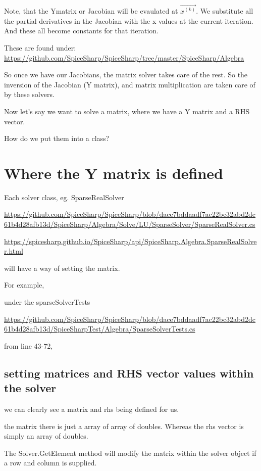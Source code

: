 \documentclass[12pt]{article}
\renewcommand{\_}{\kern-1.5pt\textunderscore\kern-1.5pt}
\begin{document}
Note, that the Ymatrix or Jacobian will be evaulated at \textbf{$\overrightarrow{x^{(k)}}$}. We substitute all the partial derivatives in the Jacobian with the x values at the current iteration. And these all become constants for that iteration.


These are found under:
\url{https://github.com/SpiceSharp/SpiceSharp/tree/master/SpiceSharp/Algebra}

So once we have our Jacobians, the matrix solver takes care of the rest.
So the inversion of the Jacobian (Y matrix), and matrix multiplication are taken care of by these solvers.

Now let's say we want to solve a matrix, where we have a Y matrix and a RHS vector.

How do we put them into a class?

\section{Where the Y matrix is defined}

Each solver class, eg. SparseRealSolver

\url{https://github.com/SpiceSharp/SpiceSharp/blob/dace7bddaadf7ac22bc32abd2dc61b4d28afb13d/SpiceSharp/Algebra/Solve/LU/SparseSolver/SparseRealSolver.cs}

\url{https://spicesharp.github.io/SpiceSharp/api/SpiceSharp.Algebra.SparseRealSolver.html}

will have a way of setting the matrix.

For example,

under the sparseSolverTests

\url{https://github.com/SpiceSharp/SpiceSharp/blob/dace7bddaadf7ac22bc32abd2dc61b4d28afb13d/SpiceSharpTest/Algebra/SparseSolverTests.cs}

from line 43-72, 

\subsection{setting matrices and RHS vector values within the solver}

we can clearly see a matrix and rhs being defined for us.

the matrix there is just a array of array of doubles. Whereas the rhs vector is simply an array of doubles. 

The Solver.GetElement method will modify the matrix within the solver object if a row and column is supplied.
\end{document}
